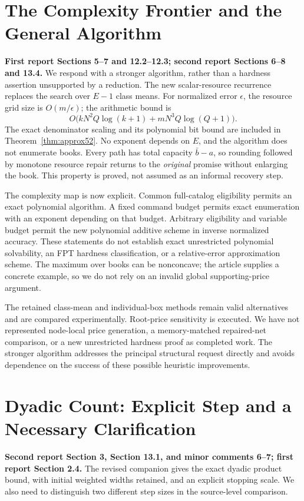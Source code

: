 \section{The Complexity Frontier and the General Algorithm}
\textbf{First report Sections 5--7 and 12.2--12.3; second report Sections 6--8 and 13.4.}
We respond with a stronger algorithm, rather than a hardness assertion unsupported by a reduction. The new scalar-resource recurrence replaces the search over $E-1$ class means. For normalized error $\epsilon$, the resource grid size is $O(m/\epsilon)$; the arithmetic bound is
\[
 O\bigl(kN^2Q\log(k+1)+mN^3Q\log(Q+1)\bigr).
\]
The exact denominator scaling and its polynomial bit bound are included in Theorem~\ref{thm:approx52}. No exponent depends on $E$, and the algorithm does not enumerate books. Every path has total capacity $\bar b-a$, so rounding followed by monotone resource repair returns to the \emph{original} promise without enlarging the book. This property is proved, not assumed as an informal recovery step.

The complexity map is now explicit. Common full-catalog eligibility permits an exact polynomial algorithm. A fixed command budget permits exact enumeration with an exponent depending on that budget. Arbitrary eligibility and variable budget permit the new polynomial additive scheme in inverse normalized accuracy. These statements do not establish exact unrestricted polynomial solvability, an FPT hardness classification, or a relative-error approximation scheme. The maximum over books can be nonconcave; the article supplies a concrete example, so we do not rely on an invalid global supporting-price argument.

The retained class-mean and individual-box methods remain valid alternatives and are compared experimentally. Root-price sensitivity is executed. We have not represented node-local price generation, a memory-matched repaired-net comparison, or a new unrestricted hardness proof as completed work. The stronger algorithm addresses the principal structural request directly and avoids dependence on the success of these possible heuristic improvements.

\section{Dyadic Count: Explicit Step and a Necessary Clarification}
\textbf{Second report Section 3, Section 13.1, and minor comments 6--7; first report Section 2.4.}
The revised companion gives the exact dyadic product bound, with initial weighted widths retained, and an explicit stopping scale. We also need to distinguish two different step sizes in the source-level comparison.

